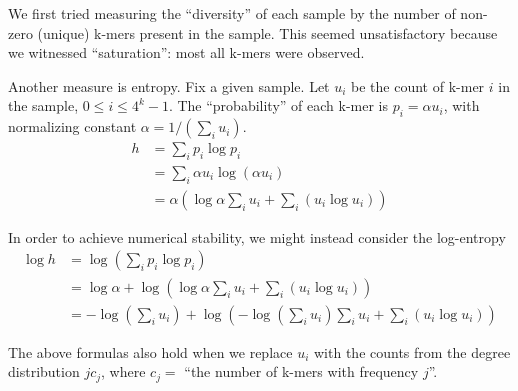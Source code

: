 \documentclass[10pt,letterpaper]{article}
\begin{document}

We first tried measuring the “diversity” of each sample by the number of non-zero (unique) k-mers present in the sample.  This seemed unsatisfactory because we witnessed ``saturation'': most all k-mers were observed.

Another measure is entropy.
Fix a given sample.
Let $u_i$ be the count of k-mer $i$ in the sample, $0 \leq i \leq 4^k-1$.
The ``probability'' of each k-mer is $p_i = \alpha u_i$, with normalizing constant $\alpha = 1/(\sum_i u_i)$.
\begin{align*}
h &= \sum_i p_i \log p_i \\
 &= \sum_i \alpha u_i \log (\alpha u_i) \\
 &= \alpha (\log \alpha \sum_i u_i + \sum_i (u_i \log u_i))
\end{align*}

In order to achieve numerical stability, we might instead consider the log-entropy
\begin{align*}
\log h &= \log( \sum_i p_i \log p_i) \\
 &= \log \alpha + \log(\log \alpha \sum_i u_i + \sum_i (u_i \log u_i)) \\
 &= -\log(\sum_i u_i) + \log(-\log(\sum_i u_i) \sum_i u_i + \sum_i (u_i \log u_i)) 
\end{align*}

The above formulas also hold when we replace $u_i$ with 
the counts from the degree distribution $j c_j$, where $c_j = $ ``the number of k-mers with frequency $j$''. 
\end{document}
